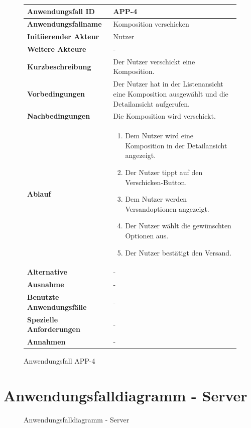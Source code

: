 \begin{figure}[h]
	\centering
	\begin{tabularx}{\textwidth}{ X | X }
		\textbf{Anwendungsfall ID} & APP-4 \\ \hline
		\textbf{Anwendungsfallname} & Komposition verschicken \\ \hline
		\textbf{Initiierender Akteur} & Nutzer \\ \hline
		\textbf{Weitere Akteure} & -  \\ \hline
		\textbf{Kurzbeschreibung} & Der Nutzer verschickt eine Komposition.  \\ \hline
		\textbf{Vorbedingungen} & Der Nutzer hat in der Listenansicht eine Komposition ausgewählt und die Detailansicht aufgerufen.  \\ \hline
		\textbf{Nachbedingungen} & Die Komposition wird verschickt.  \\ \hline
		\textbf{Ablauf} &
		\begin{enumerate}
			\item Dem Nutzer wird eine Komposition in der Detailansicht angezeigt.
			\item Der Nutzer tippt auf den Verschicken-Button.
			\item Dem Nutzer werden Versandoptionen angezeigt.
			\item Der Nutzer wählt die gewünschten Optionen aus.
			\item Der Nutzer bestätigt den Versand.
		\end{enumerate} \\ \hline
		\textbf{Alternative} &
		-  \\ \hline
		\textbf{Ausnahme} &
		- \\ \hline
		\textbf{Benutzte Anwendungsfälle} & - \\ \hline
		\textbf{Spezielle Anforderungen} & - \\ \hline
		\textbf{Annahmen} & -
	\end{tabularx}
	\caption{Anwendungsfall APP-4}
	\label{fig:anwendungsfall-app-tabelle-APP-4}
\end{figure}

\newpage


\section{Anwendungsfalldiagramm - Server}

\begin{figure}[h]
	\centering
	\caption{Anwendungsfalldiagramm - Server}
	\label{fig:anwendungsfalldiagramm-server}
\end{figure}

